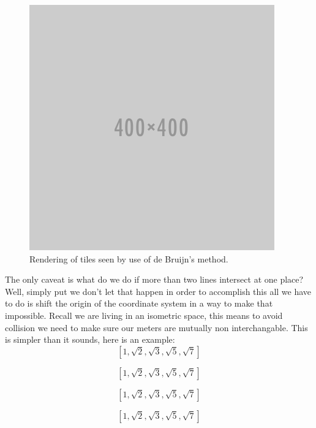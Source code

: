 \documentclass{amsart}
\begin{document}
\begin{figure}[h]
  \centering
  \includegraphics[width=0.8\linewidth]{figures/placeholder}
  \caption{Rendering of tiles seen by use of de Bruijn's method.}
  \label{fig:db-vis}
\end{figure}

The only caveat is what do we do if more than two lines intersect at one place? Well, simply put we don’t let that happen in order to accomplish this all we have to do is shift the origin of the coordinate system in a way to make that impossible. Recall we are living in an isometric space, this means to avoid collision we need to make sure our meters are mutually non interchangable. This is simpler than it sounds, here is an example:
\begin{equation}
 \left[1, \sqrt{2}, \sqrt{3}, \sqrt{5}, \sqrt{7}\right]
 \label{eq:punt}
\end{equation}

\begin{equation}
 \left[1, \sqrt{2}, \sqrt{3}, \sqrt{5}, \sqrt{7}\right]
 \label{eq:pr_1}
\end{equation}

\begin{equation}
 \left[1, \sqrt{2}, \sqrt{3}, \sqrt{5}, \sqrt{7}\right]
 \label{eq:pr_2}
\end{equation}

\begin{equation}
 \left[1, \sqrt{2}, \sqrt{3}, \sqrt{5}, \sqrt{7}\right]
 \label{eq:pr_3}
\end{equation}
\end{document}
